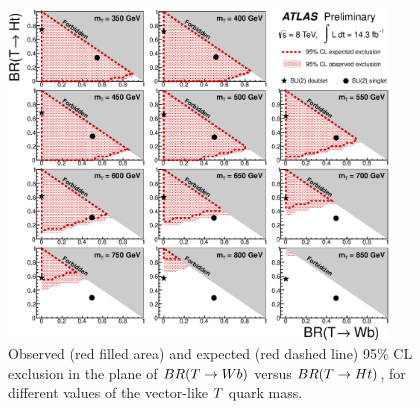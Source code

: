 \begin{figure}[htbp]
\centering
\includegraphics[width=0.9\textwidth]{results/figures/htx/lim_2D.eps}
\caption{
Observed (red filled area) and expected (red dashed line) 95\% CL exclusion in the plane of
$BR(\T \to Wb)$ versus $BR(\T \to Ht)$, for different values of the vector-like $\T$ quark mass.
\label{fig:limits2D_htx}}
\end{figure}

